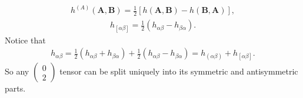\documentclass[12pt]{book}
\begin{document}
    \begin{align}
    h^{(A)}(\mathbf{A},\mathbf{B}) = \frac{1}{2} \left[ h(\mathbf{A},\mathbf{B}) - h(\mathbf{B},\mathbf{A}) \right],
    \end{align}
    \begin{align}
    h_{[\alpha\beta]} = \frac{1}{2} \left( h_{\alpha\beta} - h_{\beta\alpha} \right). \tag{3.34}
    \end{align}
    Notice that
    \begin{align}
    h_{\alpha\beta} = \frac{1}{2} \left( h_{\alpha\beta} + h_{\beta\alpha} \right) + \frac{1}{2} \left( h_{\alpha\beta} - h_{\beta\alpha} \right)
    = h_{(\alpha\beta)} + h_{[\alpha\beta]}. \tag{3.35}
    \end{align}
    So any \(\left(\begin{array}{c} 0 \\ 2 \end{array}\right)\) tensor can be split uniquely into its symmetric and antisymmetric parts.
    
\end{document}
